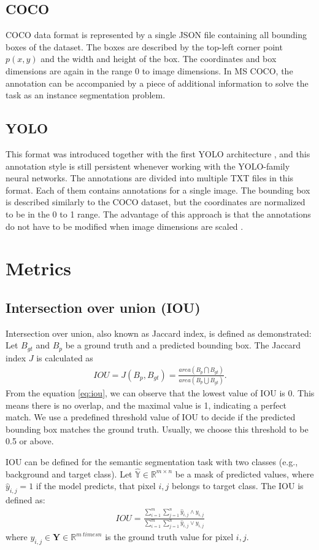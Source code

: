 \subsection{COCO}
COCO data format is represented by a single JSON file containing all bounding boxes of the dataset. The boxes are described by the top-left corner point $p(x,y)$ and the width and height of the box. The coordinates and box dimensions are again in the range 0 to image dimensions. In MS COCO, the annotation can be accompanied by a piece of additional information to solve the task as an instance segmentation problem.
\subsection{YOLO}
This format was introduced together with the first YOLO architecture \cite{Redmon2015}, and this annotation style is still persistent whenever working with the YOLO-family neural networks.
The annotations are divided into multiple TXT files in this format. Each of them contains annotations for a single image.
The bounding box is described similarly to the COCO dataset, but the coordinates are normalized to be in the 0 to 1 range. The advantage of this approach is that the annotations do not have to be modified when image dimensions are scaled \cite{Redmon2015, Padilla2021}.


\section{Metrics}
\subsection{Intersection over union (IOU) }
Intersection over union, also known as Jaccard index, is defined as demonstrated: Let $B_{gt}$ and $B_p$ be a ground truth and a predicted bounding box. The Jaccard index $J$ is calculated as
\begin{align}
    IOU = J(B_p, B_{gt}) = \frac{area(B_p \bigcap B_{gt})}{area(B_p \bigcup B_{gt})}.
    \label{eq:iou}
\end{align}
From the equation \ref{eq:iou}, we can observe that the lowest value of IOU is 0. This means there is no overlap, and the maximal value is 1, indicating a perfect match.
We use a predefined threshold value of IOU to decide if the predicted bounding box matches the ground truth. Usually, we choose this threshold to be 0.5 or above.

IOU can be defined for the semantic segmentation task with two classes (e.g., background and target class). Let $\mathbb{\hat{Y}} \in \mathbb{R}^{m \times n}$ be a mask of predicted values, where $\hat{y}_{i,j} = 1$ if the model predicts, that pixel $i,j$ belongs to target class. The IOU is defined as:
\begin{align}
    IOU = \frac{\sum_{i=1}^{m} \sum_{j=1}^{n} \hat{y}_{i,j} \wedge  y_{i,j}}{\sum_{i=1}^{m} \sum_{j=1}^{n} \hat{y}_{i,j} \vee  y_{i,j}}
\end{align}
where $y_{i,j} \in \mathbf{Y} \in \mathbb{R} ^ {m \ times n}$ is the ground truth value for pixel $i,j$.



